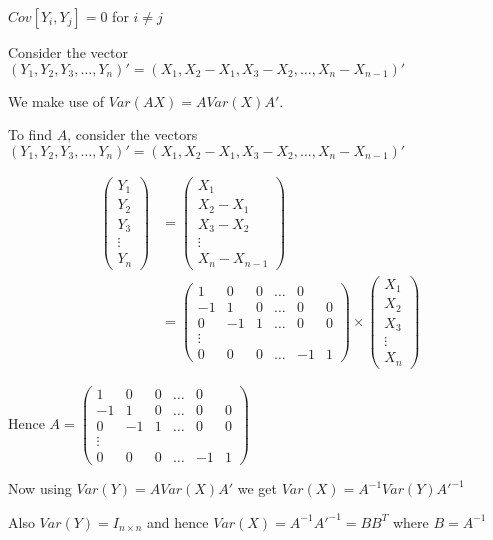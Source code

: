 \documentclass[a4paper]{article}
\begin{document}
$Cov[Y_i,Y_j]=0$ for $i \neq j$

Consider the vector $(Y_1, Y_2, Y_3, \dots, Y_n)' = (X_1,X_2-X_1,X_3-X_2, \dots, X_n-X_{n-1})'$ 

We make use of $Var(AX) = AVar(X)A'$.

To find $A$, consider the vectors $(Y_1, Y_2, Y_3, \dots, Y_n)' = (X_1,X_2-X_1,X_3-X_2, \dots, X_n-X_{n-1})'$ 

\begin{align*}
\begin{pmatrix}
Y_1\\
Y_2\\
Y_3\\
\vdots\\
Y_n
\end{pmatrix} &= \begin{pmatrix}
X_1\\
X_2-X_1\\
X_3-X_2\\
\vdots\\
X_n-X_{n-1}
\end{pmatrix}\\
&= \begin{pmatrix}1 & 0 & 0 & \dots & 0\\
-1 & 1 & 0 & \dots & 0 & 0\\
0 & -1 & 1 & \dots & 0 & 0\\
\vdots \\
0 & 0 & 0 & \dots & -1 & 1
\end{pmatrix} \times \begin{pmatrix}
X_1\\
X_2\\
X_3\\
\vdots\\
X_n
\end{pmatrix}
\end{align*}

Hence $A=\begin{pmatrix}1 & 0 & 0 & \dots & 0\\
-1 & 1 & 0 & \dots & 0 & 0\\
0 & -1 & 1 & \dots & 0 & 0\\
\vdots \\
0 & 0 & 0 & \dots & -1 & 1
\end{pmatrix}$


Now using $Var(Y) = AVar(X)A'$ we get 
$Var(X) = A^{-1}Var(Y)A'^{-1}$

Also $Var(Y) = I_{n\times n}$
and hence $Var(X) = A^{-1}A'^{-1} = BB^T$ where $B=A^{-1}$
\end{document}
